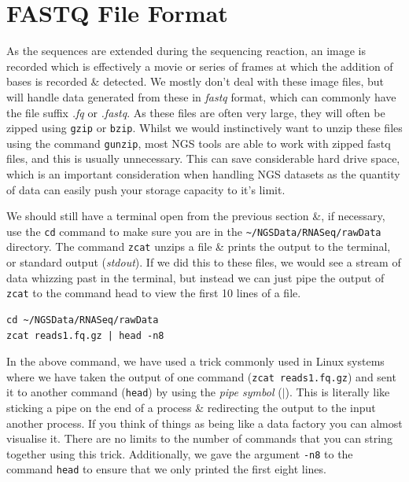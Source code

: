 \section{FASTQ File Format}
\begin{note}
As the sequences are extended during the sequencing reaction, an image is recorded which is effectively a movie or series of frames at which the addition of bases is recorded \& detected.
We mostly don't deal with these image files, but will handle data generated from these in \textit{fastq} format, which can commonly have the file suffix \textit{.fq} or \textit{.fastq}.
As these files are often very large, they will often be zipped using \texttt{gzip} or \texttt{bzip}.
Whilst we would instinctively want to unzip these files using the command \texttt{gunzip}, most NGS tools are able to work with zipped fastq files, and this is usually unnecessary.
This can save considerable hard drive space, which is an important consideration when handling NGS datasets as the quantity of data can easily push your storage capacity to it's limit. \\
\end{note}

\begin{steps}
We should still have a terminal open from the previous section \&, if necessary, use the \texttt{cd} command to make sure you are in the \texttt{\~{}/NGSData/RNASeq/rawData} directory.
The command \texttt{zcat} unzips a file \& prints the output to the terminal, or standard output (\textit{stdout}).
If we did this to these files, we would see a stream of data whizzing past in the terminal, but instead we can just pipe the output of \texttt{zcat} to the command head to view the first 10 lines of a file. \\
\begin{lstlisting}
cd ~/NGSData/RNASeq/rawData
zcat reads1.fq.gz | head -n8
\end{lstlisting}
\end{steps}

\begin{information}
In the above command, we have used a trick commonly used in Linux systems where we have taken the output of one command (\texttt{zcat reads1.fq.gz}) and sent it to another command (\texttt{head}) by using the \textit{pipe symbol} ($\mid$).
This is literally like sticking a pipe on the end of a process \& redirecting the output to the input another process.
If you think of things as being like a data factory you can almost visualise it.
There are no limits to the number of commands that you can string together using this trick.
Additionally, we gave the argument \texttt{-n8} to the command \texttt{head} to ensure that we only printed the first eight lines.\\
\end{information}


